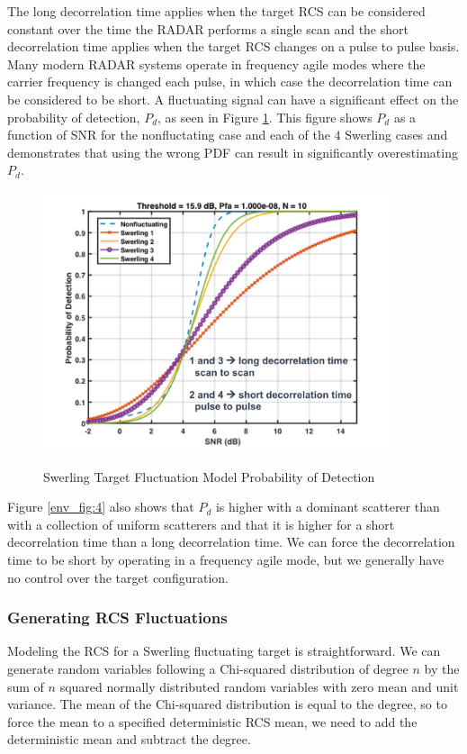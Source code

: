 The long decorrelation time applies when the target RCS can be considered constant over the time the RADAR performs a single scan and the short decorrelation time applies when the target RCS changes on a pulse to pulse basis. Many modern RADAR systems operate in frequency agile modes where the carrier frequency is changed each pulse, in which case the decorrelation time can be considered to be short. A fluctuating signal can have a significant effect on the probability of detection, $P_d$, as seen in Figure \ref{env_fig:5}. This figure shows $P_d$ as a function of SNR for the nonfluctating case and each of the $4$ Swerling cases and demonstrates that using the wrong PDF can result in significantly overestimating $P_d$.
\begin{figure}[H]
  \begin{center}
\includegraphics[width=4in]{../media/multistatic/swerling_pd.png}
  \end{center}
  \renewcommand{\baselinestretch}{1} \small\normalsize
  \begin{quote}
    \caption[Swerling Target Fluctuation Model Probability of Detection]{Swerling Target Fluctuation Model Probability of Detection\label{env_fig:5}}
  \end{quote}
\end{figure}
\renewcommand{\baselinestretch}{2} \small\normalsize

Figure \ref{env_fig:4} also shows that $P_d$ is higher with a dominant scatterer than with a collection of uniform scatterers and that it is higher for a short decorrelation time than a long decorrelation time. We can force the decorrelation time to be short by operating in a frequency agile mode, but we generally have no control over the target configuration.

\subsubsection{Generating RCS Fluctuations}
Modeling the RCS for a Swerling fluctuating target is straightforward. We can generate random variables following a Chi-squared distribution of degree $n$ by the sum of $n$ squared normally distributed random variables with zero mean and unit variance. The mean of the Chi-squared distribution is equal to the degree, so to force the mean to a specified deterministic RCS mean, we need to add the deterministic mean and subtract the degree.

